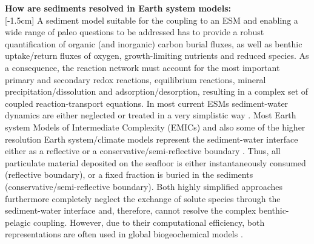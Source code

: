 \documentclass[gmd, manuscript]{copernicus}
\begin{document}

\textbf{How are sediments resolved in Earth system models:}\\
[-1.5cm]%
A sediment model suitable for the coupling to an ESM and enabling a wide range of paleo questions to be addressed has to provide a robust quantification of organic (and inorganic) carbon burial fluxes, 
as well as benthic uptake/return fluxes of oxygen, growth-limiting nutrients and reduced species. As a consequence, the reaction network must account for the most important primary 
and secondary redox reactions, equilibrium reactions, mineral precipitation/dissolution and adsorption/desorption, resulting in a complex set of coupled reaction-transport 
equations. 
In most current ESMs sediment-water dynamics are either neglected or treated in a very simplistic way \citep{soetaert_coupling_2000, hulse_understanding_2017}. 
Most Earth system Models of Intermediate Complexity (EMICs) and also some of the higher resolution Earth system/climate models represent the sediment-water interface either as a 
reflective or a conservative/semi-reflective boundary \citep{hulse_understanding_2017}. 
Thus, all particulate material deposited on the seafloor is either instantaneously consumed (reflective boundary), or a fixed fraction is buried in the sediments (conservative/semi-reflective boundary). 
Both highly simplified approaches furthermore completely neglect the exchange of solute species through the sediment-water interface and, therefore, cannot resolve the complex benthic-pelagic coupling. 
However, due to their computational efficiency, both representations are often used in global biogeochemical models \citep[e.g.][]{najjar_impact_2007, ridgwell_marine_2007, goosse_description_2010}. 
\end{document}
